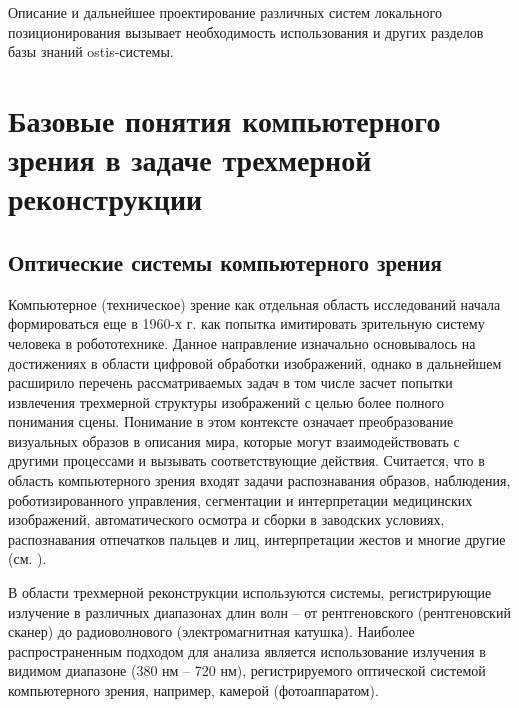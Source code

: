 Описание и дальнейшее проектирование различных систем локального позиционирования вызывает необходимость использования и других разделов базы знаний ostis-системы. 

\section{Базовые понятия компьютерного зрения в задаче трехмерной реконструкции}
\label{sec_3d_models_computervision}

\subsection{Оптические системы компьютерного зрения}

Компьютерное (техническое) зрение как отдельная область исследований начала формироваться еще в 1960-х г. как попытка имитировать зрительную систему человека в робототехнике. Данное направление изначально основывалось на достижениях в области цифровой обработки изображений, однако в дальнейшем расширило перечень рассматриваемых задач в том числе засчет попытки извлечения трехмерной структуры изображений с целью более полного понимания сцены. Понимание в этом контексте означает преобразование визуальных образов в описания мира, которые могут взаимодействовать с другими процессами и вызывать соответствующие действия. Считается, что в область компьютерного зрения входят задачи распознавания образов, наблюдения, роботизированного управления, сегментации и интерпретации медицинских изображений, автоматического осмотра и сборки в заводских условиях, распознавания отпечатков пальцев и лиц, интерпретации жестов и многие другие (см. ).

\begin{SCn}
\end{SCn}

В области трехмерной реконструкции используются системы, регистрирующие излучение в различных диапазонах длин волн -- от рентгеновского (рентгеновский сканер) до радиоволнового (электромагнитная катушка). Наиболее распространенным подходом для анализа является использование излучения в видимом диапазоне (380 нм -- 720 нм), регистрируемого оптической системой компьютерного зрения, например, камерой (фотоаппаратом). 

